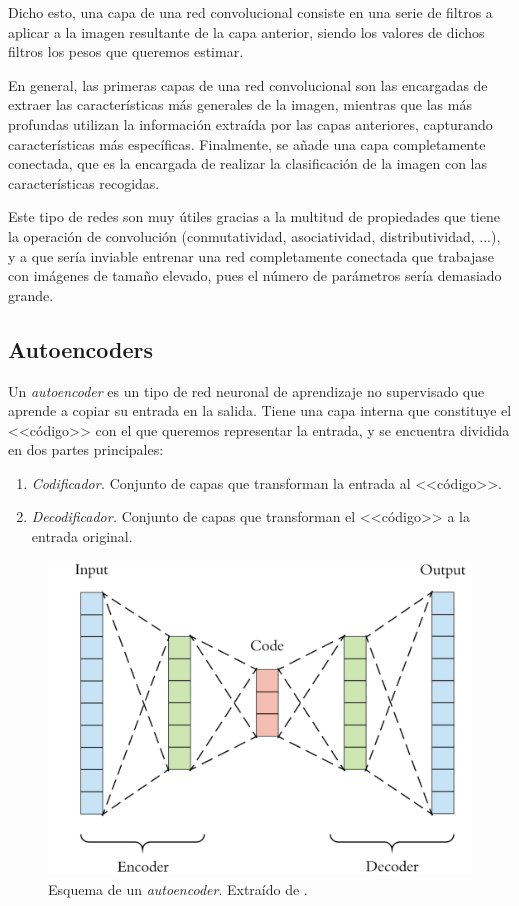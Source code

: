\documentclass[
  a4paper,
  12pt,
  spanish,
]{scrartcl}
\theoremstyle{teorema-style}
\begin{document}
Dicho esto, una capa de una red convolucional consiste en una serie de filtros a aplicar a la imagen resultante de la capa anterior, siendo los valores de dichos filtros los pesos que queremos estimar.

En general, las primeras capas de una red convolucional son las encargadas de extraer las características más generales de la imagen, mientras que las más profundas utilizan la información extraída por las capas anteriores, capturando características más específicas. Finalmente, se añade una capa completamente conectada, que es la encargada de realizar la clasificación de la imagen con las características recogidas.

Este tipo de redes son muy útiles gracias a la multitud de propiedades que tiene la operación de convolución (conmutatividad, asociatividad, distributividad, ...), y a que sería inviable entrenar una red completamente conectada que trabajase con imágenes de tamaño elevado, pues el número de parámetros sería demasiado grande.

\subsection{Autoencoders}

Un \textit{autoencoder} es un tipo de red neuronal de aprendizaje no supervisado que aprende a copiar su entrada en la
salida. Tiene una capa interna que constituye el <<código>> con
el que queremos representar la entrada, y se encuentra dividida en dos partes principales:
\begin{enumerate}
  \item \textit{Codificador. } Conjunto de capas que transforman la entrada al <<código>>.
  \item \textit{Decodificador. } Conjunto de capas que transforman el <<código>> a la entrada original.
\end{enumerate}

\begin{figure}[h]
  \centering
  \includegraphics[width=.7\textwidth]{img/autoencoder}
  \caption{Esquema de un \textit{autoencoder}. Extraído de \parencite{arden_autoencoder_2017}.}
  \label{fig:autoencoder}
\end{figure}
\end{document}
